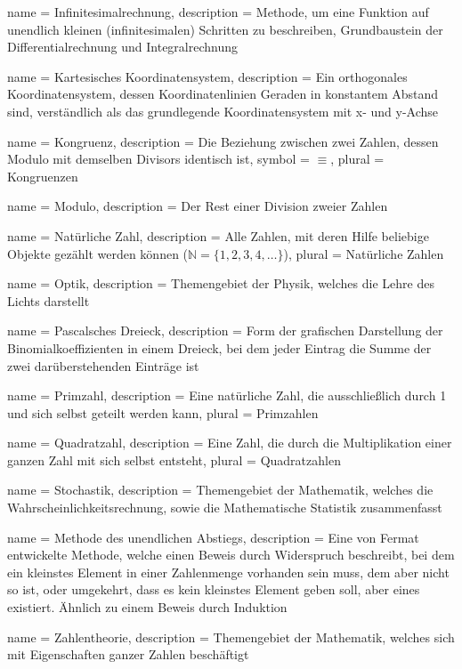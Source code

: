 {
    name = Infinitesimalrechnung,
    description = {Methode, um eine Funktion auf unendlich kleinen (infinitesimalen) Schritten zu beschreiben, Grundbaustein der \Gls{Differentialrechnung} und \Gls{Integralrechnung}}
}

{
    name = Kartesisches Koordinatensystem,
    description = {Ein orthogonales Koordinatensystem, dessen Koordinatenlinien Geraden in konstantem Abstand sind, verständlich als das grundlegende Koordinatensystem mit x- und y-Achse}
}

{
    name = Kongruenz,
    description = {Die Beziehung zwischen zwei Zahlen, dessen \Gls{Modulo} mit demselben Divisors identisch ist},
    symbol = {\ensuremath{\equiv}},
    plural = {Kongruenzen}
}

{
    name = Modulo,
    description = {Der Rest einer Division zweier Zahlen}
}

{
    name = Natürliche Zahl,
    description = {Alle Zahlen, mit deren Hilfe beliebige Objekte gezählt werden können ($\mathbb{N} = \{ 1,2,3,4, \dots \}$)},
    plural = {Natürliche Zahlen}
}

{
    name = Optik,
    description = {Themengebiet der Physik, welches die Lehre des Lichts darstellt}
}

{
    name = Pascalsches Dreieck,
    description = {Form der grafischen Darstellung der Binomialkoeffizienten in einem Dreieck, bei dem jeder Eintrag die Summe der zwei darüberstehenden Einträge ist}
}

{
    name = Primzahl,
    description = {Eine natürliche Zahl, die ausschließlich durch 1 und sich selbst geteilt werden kann},
    plural = {Primzahlen}
}

{
    name = Quadratzahl,
    description = {Eine Zahl, die durch die Multiplikation einer ganzen Zahl mit sich selbst entsteht},
    plural = {Quadratzahlen}
}

{
    name = Stochastik,
    description = {Themengebiet der Mathematik, welches die Wahrscheinlichkeitsrechnung, sowie die Mathematische Statistik zusammenfasst}
}

{
    name = Methode des unendlichen Abstiegs,
    description = {Eine von Fermat entwickelte Methode, welche einen Beweis durch Widerspruch beschreibt, bei dem ein kleinstes Element in einer Zahlenmenge vorhanden sein muss, dem aber nicht so ist, oder umgekehrt, dass es kein kleinstes Element geben soll, aber eines existiert. Ähnlich zu einem Beweis durch Induktion}
}

{
    name = Zahlentheorie,
    description = {Themengebiet der Mathematik, welches sich mit Eigenschaften ganzer Zahlen beschäftigt}
}

